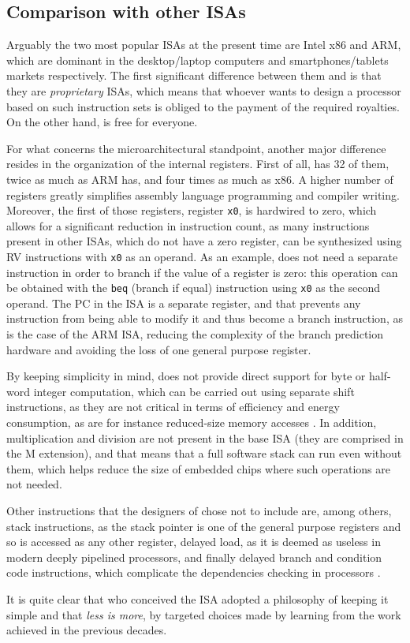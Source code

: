 \subsection{Comparison with other \acsp{ISA}}\label{sec:isas}
Arguably the two most popular \acp{ISA} at the present time are Intel x86 and ARM, which are dominant in the desktop/laptop computers and smartphones/tablets markets respectively. The first significant difference between them and \riscv is that they are \emph{proprietary} \acp{ISA}, which means that whoever wants to design a processor based on such instruction sets is obliged to the payment of the required royalties. On the other hand, \riscv is free for everyone.

For what concerns the microarchitectural standpoint, another major difference resides in the organization of the internal registers. First of all, \riscv has 32 of them, twice as much as ARM has, and four times as much as x86. A higher number of registers greatly simplifies assembly language programming and compiler writing. Moreover, the first of those registers, register \texttt{x0}, is hardwired to zero, which allows for a significant reduction in instruction count, as many instructions present in other \acp{ISA}, which do not have a zero register, can be synthesized using RV instructions with \texttt{x0} as an operand. As an example, \riscv does not need a separate instruction in order to branch if the value of a register is zero: this operation can be obtained with the \texttt{beq} (branch if equal) instruction using \texttt{x0} as the second operand. The \ac{PC} in the \riscv \ac{ISA} is a separate register, and that prevents any instruction from being able to modify it and thus become a branch instruction, as is the case of the ARM \ac{ISA}, reducing the complexity of the branch prediction hardware and avoiding the loss of one general purpose register.

By keeping simplicity in mind, \riscv does not provide direct support for byte or half-word integer computation, which can be carried out using separate shift instructions, as they are not critical in terms of efficiency and energy consumption, as are for instance reduced-size memory accesses \cite[p.~20]{reader}. In addition, multiplication and division are not present in the base \ac{ISA} (they are comprised in the M extension), and that means that a full software stack can run even without them, which helps reduce the size of embedded chips where such operations are not needed.

Other instructions that the designers of \riscv chose not to include are, among others, stack instructions, as the stack pointer is one of the general purpose registers and so is accessed as any other register, delayed load, as it is deemed as useless in modern deeply pipelined processors, and finally delayed branch and condition code instructions, which complicate the dependencies checking in \ooo processors \cite[p.~21]{reader}.

It is quite clear that who conceived the \riscv \ac{ISA} adopted a philosophy of keeping it simple and that \emph{less is more}, by targeted choices made by learning from the work achieved in the previous decades.